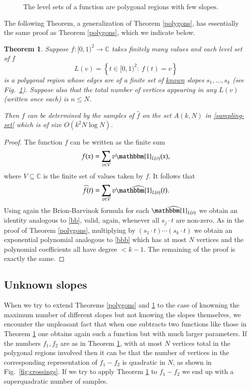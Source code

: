 \documentclass[12pt,a4paper,oneside]{amsart}
\newtheorem{theorem}{Theorem}[section]
\theoremstyle{definition}
\newcommand{\Set}[1]{{\left\{{#1}\right\}}}
\newcommand{\CC}{{\mathbb C}}
\newcommand{\one}{{\mathbbm{1}}}
\newcommand{\ft}[1]{\widehat{#1}}
\newcommand{\red}[1]{{#1}}
\newcounter{rem}
\begin{document}
\begin{figure}[h]
 
 \caption{The level sets of a function are polygonal regions with few slopes.}\label{fig:levelsets}
\end{figure}

The following Theorem, a generalization of Theorem \ref{polygons}, has essentially the same proof \red{as Theorem \ref{polygons}}, which we indicate below.
\begin{theorem}\label{values}
Suppose $f:[0, 1)^2\to\CC$ takes finitely many values and each level set of $f$
$$
L(v) = \Set{t \in [0, 1)^2:\ f(t) = v}
$$
is a polygonal region whose edges are of a finite set of \underline{known} slopes $s_1, \ldots, s_k$ (see Fig.\ \ref{fig:levelsets}). Suppose also that the total number of vertices appearing in any $L(v)$ (written once each) is $n\le N$.

Then $f$ can be determined by the samples of $\ft{f}$ on the set $A(k, N)$ in \eqref{sampling-set} which is of size $O(k^2 N \log N)$.
\end{theorem}

\begin{proof}
The function $f$ can be written as the finite sum
$$
f(x) = \sum_{v \in V} v \one_{L(v)}(x),
$$
where $V \subseteq \CC$ is the finite set of values taken by $f$. It follows that
$$
\ft{f}(t) = \sum_{v \in V} v \ft{\one_{L(v)}}(t).
$$
Using again the Brion-Barvinok formula for each $\ft{\one_{L(v)}}$ we obtain an identity analogous to \eqref{bb}, valid, again, whenever all $s_j \cdot t$ are non-zero. As in the proof of Theorem \ref{polygons}, multiplying by $(s_1 \cdot t) \cdots (s_k \cdot t)$ we obtain an exponential polynomial analogous to \eqref{bbb} which has at most $N$ vertices and the polynomial coefficients all have degree $< k-1$. The remaining of the proof is exactly the same.

\end{proof}


\subsection{Unknown slopes}\label{ss:unknown-slopes}

When we try to extend Theorems \ref{polygons} and \ref{values} to the case of knowning the maximum number of different slopes but not knowing the slopes themselves, we encounter the unpleasant fact that when one subtracts two functions like those in Theorem \ref{values} one obtains again such a function but with much larger parameters. If the numbers $f_1, f_2$ are as in Theorem \ref{values}, with at most $N$ vertices total in the polygonal regions involved then it can be that the number of vertices in the corresponding representation of $f_1-f_2$ is quadratic in $N$, as shown in Fig.\ \ref{fig:crossings}. If we try to apply Theorem \ref{values} to $f_1-f_2$ we end up with a superquadratic number of samples.
\end{document}
